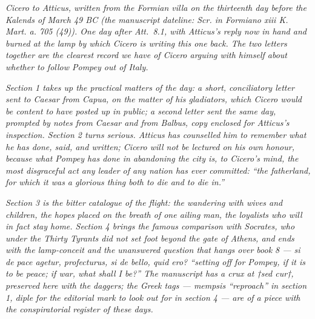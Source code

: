 
\textit{Cicero to Atticus, written from the Formian
villa on the thirteenth day before the Kalends of
March 49 BC (the manuscript dateline: \textit{Scr. in
Formiano xiii K. Mart. a. 705 (49)}). One day after
\textit{Att.}~8.1, with Atticus's reply now in hand
and burned at the lamp by which Cicero is writing
this one back. The two letters together are the
clearest record we have of Cicero arguing with himself
about whether to follow Pompey out of Italy.}

\textit{Section 1 takes up the practical matters of
the day: a short, conciliatory letter sent to Caesar
from Capua, on the matter of his gladiators, which
Cicero would be content to have posted up in public;
a second letter sent the same day, prompted by
notes from Caesar and from Balbus, copy enclosed
for Atticus's inspection. Section 2 turns serious.
Atticus has counselled him to remember what he has
done, said, and written; Cicero will not be lectured
on his own honour, because what Pompey has done in
abandoning the city is, to Cicero's mind, the most
disgraceful act any leader of any nation has ever
committed: ``the fatherland, for which it was a
glorious thing both to die and to die in.''}

\textit{Section 3 is the bitter catalogue of the
flight: the wandering with wives and children, the
hopes placed on the breath of one ailing man, the
loyalists who will in fact stay home. Section 4
brings the famous comparison with Socrates, who under
the Thirty Tyrants did not set foot beyond the gate
of Athens, and ends with the lamp-conceit and the
unanswered question that hangs over book 8 ---
\textit{si de pace agetur, profecturus, si de bello,
quid ero?} ``setting off for Pompey, if it is to be
peace; if war, what shall I be?'' The manuscript has
a crux at \textit{†sed cur†}, preserved here with the
daggers; the Greek tags --- \textit{mempsis}
``reproach'' in section 1, \textit{diple} for the
editorial mark to look out for in section 4 --- are
of a piece with the conspiratorial register of these
days.}
